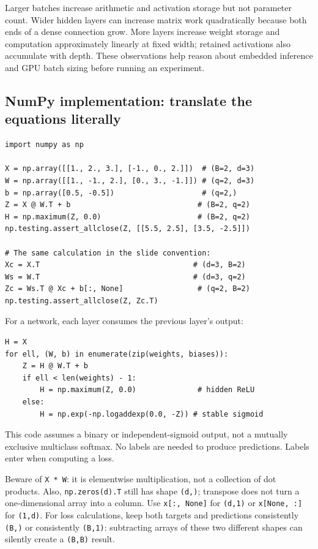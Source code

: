Larger batches increase arithmetic and activation storage but not parameter count. Wider hidden layers can increase matrix work quadratically because both ends of a dense connection grow. More layers increase weight storage and computation approximately linearly at fixed width; retained activations also accumulate with depth. These observations help reason about embedded inference and GPU batch sizing before running an experiment.

\subsection{NumPy implementation: translate the equations literally}
\begin{lstlisting}
import numpy as np

X = np.array([[1., 2., 3.], [-1., 0., 2.]])  # (B=2, d=3)
W = np.array([[1., -1., 2.], [0., 3., -1.]]) # (q=2, d=3)
b = np.array([0.5, -0.5])                    # (q=2,)
Z = X @ W.T + b                             # (B=2, q=2)
H = np.maximum(Z, 0.0)                      # (B=2, q=2)
np.testing.assert_allclose(Z, [[5.5, 2.5], [3.5, -2.5]])

# The same calculation in the slide convention:
Xc = X.T                                   # (d=3, B=2)
Ws = W.T                                   # (d=3, q=2)
Zc = Ws.T @ Xc + b[:, None]                 # (q=2, B=2)
np.testing.assert_allclose(Z, Zc.T)
\end{lstlisting}
For a network, each layer consumes the previous layer's output:
\begin{lstlisting}
H = X
for ell, (W, b) in enumerate(zip(weights, biases)):
    Z = H @ W.T + b
    if ell < len(weights) - 1:
        H = np.maximum(Z, 0.0)              # hidden ReLU
    else:
        H = np.exp(-np.logaddexp(0.0, -Z)) # stable sigmoid
\end{lstlisting}
This code assumes a binary or independent-sigmoid output, not a mutually exclusive multiclass softmax. No labels are needed to produce predictions. Labels enter when computing a loss.

Beware of \texttt{X * W}: it is elementwise multiplication, not a collection of dot products. Also, \texttt{np.zeros(d).T} still has shape \texttt{(d,)}; transpose does not turn a one-dimensional array into a column. Use \texttt{x[:, None]} for \texttt{(d,1)} or \texttt{x[None, :]} for \texttt{(1,d)}. For loss calculations, keep both targets and predictions consistently \texttt{(B,)} or consistently \texttt{(B,1)}: subtracting arrays of these two different shapes can silently create a \texttt{(B,B)} result.

